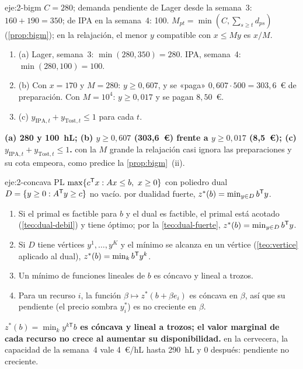 \begin{solucion}{eje:2-bigm}
\datos $C=280$; demanda pendiente de Lager desde la semana~3: $160+190=350$; de IPA en la semana~4: 100.
\planteamiento $M_{pt}=\min(C,\sum_{s\ge t}d_{ps})$ (\cref{prop:bigm}); en la relajación, el menor $y$ compatible con $x\le My$ es $x/M$.
\pasos
\begin{enumerate}[label=\arabic*.]
  \item (a) Lager, semana~3: $\min(280,350)=280$. IPA, semana~4: $\min(280,100)=100$.
  \item (b) Con $x=170$ y $M=280$: $y\ge 0{,}607$, y se «paga» $0{,}607\cdot 500=303{,}6$~€ de preparación. Con $M=10^{4}$: $y\ge 0{,}017$ y se pagan $8{,}50$~€.
  \item (c) $y_{\mathrm{IPA},t}+y_{\mathrm{Tost},t}\le 1$ para cada $t$.
\end{enumerate}
\resultado \textbf{(a) 280 y 100~hL; (b) $y\ge 0{,}607$ (303,6~€) frente a $y\ge 0{,}017$ (8,5~€); (c) $y_{\mathrm{IPA},t}+y_{\mathrm{Tost},t}\le 1$.}
\comprobacion con la $M$ grande la relajación casi ignora las preparaciones y su cota empeora, como predice la \cref{prop:bigm}~(ii).
\end{solucion}

\begin{solucion}{eje:2-concava}
\datos PL $\max\{c^{\mathsf{T}} x: Ax\le b,\ x\ge 0\}$ con poliedro dual $D=\{y\ge 0: A^{\mathsf{T}} y\ge c\}$ no vacío.
\planteamiento por dualidad fuerte, $z^{*}(b)=\min_{y\in D}b^{\mathsf{T}} y$.
\pasos
\begin{enumerate}[label=\arabic*.]
  \item Si el primal es factible para $b$ y el dual es factible, el primal está acotado (\cref{teo:dual-debil}) y tiene óptimo; por la \cref{teo:dual-fuerte}, $z^{*}(b)=\min_{y\in D}b^{\mathsf{T}} y$.
  \item Si $D$ tiene vértices $y^{1},\dots,y^{K}$ y el mínimo se alcanza en un vértice (\cref{teo:vertice} aplicado al dual), $z^{*}(b)=\min_kb^{\mathsf{T}} y^{k}$.
  \item Un mínimo de funciones lineales de $b$ es cóncavo y lineal a trozos.
  \item Para un recurso $i$, la función $\beta\mapsto z^{*}(b+\beta e_i)$ es cóncava en $\beta$, así que su pendiente (el precio sombra $y_i^{*}$) es no creciente en $\beta$.
\end{enumerate}
\resultado \textbf{$z^{*}(b)=\min_ky^{k\mathsf{T}}b$ es cóncava y lineal a trozos; el valor marginal de cada recurso no crece al aumentar su disponibilidad.}
\comprobacion en la cervecera, la capacidad de la semana~4 vale 4~€/hL hasta 290~hL y 0 después: pendiente no creciente.
\end{solucion}

